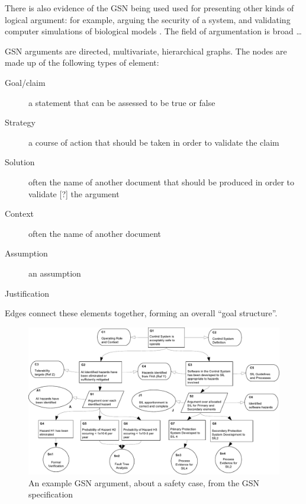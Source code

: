 There is also evidence of the GSN being used used for presenting other kinds of logical argument:
for example,
arguing the security of a system\cite{plop},
and validating computer simulations of biological models \cite{insilico}\cite{royal}. The field of argumentation is broad \ldots

GSN arguments are directed, multivariate, hierarchical graphs.
The nodes are made up of the following types of element:

\begin{description}

  \item[ Goal/claim ]
    a statement that can be assessed to be true or false

  \item[ Strategy]
    a course of action that should be taken in order to validate the claim
  
  \item[ Solution]
      often the name of another document that should be produced in order to validate [?] the argument 

  \item[ Context]
    often the name of another document

  \item[ Assumption]
    an assumption

  \item[ Justification]

\end{description}

Edges connect these elements together, forming an overall ``goal structure''. 

\begin{figure}
  \centering
  \includegraphics[width=\textwidth]{example_argument.pdf}
  \caption{An example GSN argument, about a safety case,
    from the GSN specification \cite{gsnstandard}}
  \label{fig:example}
\end{figure}




